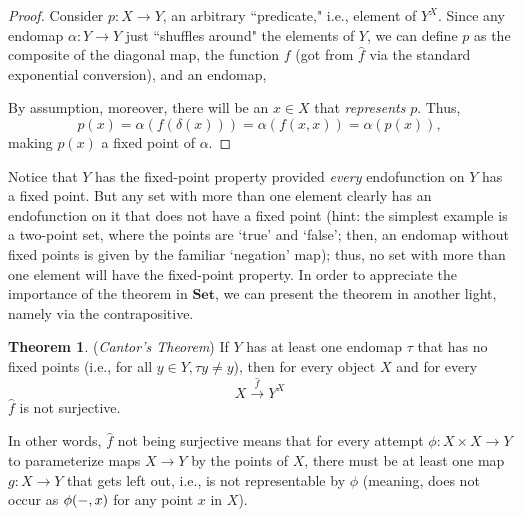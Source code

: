 \documentclass[a4paper]{book}
\theoremstyle{definition}
\theoremstyle{definition}
\theoremstyle{definition}
\newtheorem{theorem}{Theorem}[section]
\theoremstyle{theorem}
\theoremstyle{definition}
\begin{document}
\begin{proof}
	Consider $p: X \rightarrow Y$, an arbitrary ``predicate," i.e., element of $Y^X$. Since any endomap $\alpha: Y \rightarrow Y$ just ``shuffles around" the elements of $Y$, we can define $p$ as the composite of the diagonal map, the function $f$ (got from $\hat{f}$ via the standard exponential conversion), and an endomap, 
	\begin{center}
	\end{center}  
	By assumption, moreover, there will be an $x \in X$ that \textit{represents} $p$. Thus, 
	\begin{equation*}
	p(x) = \alpha(f(\delta(x))) = \alpha(f(x,x)) = \alpha(p(x)),
	\end{equation*}
	making $p(x)$ a fixed point of $\alpha$. 
\end{proof} \noindent 
Notice that $Y$ has the fixed-point property provided \textit{every} endofunction on $Y$ has a fixed point. But any set with more than one element clearly has an endofunction on it that does not have a fixed point (hint: the simplest example is a two-point set, where the points are `true' and `false'; then, an endomap without fixed points is given by the familiar `negation' map); thus, no set with more than one element will have the fixed-point property. In order to appreciate the importance of the theorem in $\textbf{Set}$, we can present the theorem in another light, namely via the contrapositive. 
\begin{theorem}
	(\textit{Cantor's Theorem}) If $Y$ has at least one endomap $\tau$ that has no fixed points (i.e., for all $y \in Y, \tau y \neq y$), then for every object $X$ and for every 
	\begin{equation*}
	X \xrightarrow{\hat{f}} Y^X 
	\end{equation*} 
	$\hat{f}$ is not surjective. \par 
	In other words, $\hat{f}$ not being surjective means that for every attempt $\phi: X \times X \rightarrow Y$ to parameterize maps $X \rightarrow Y$ by the points of $X$, there must be at least one map $g: X \rightarrow Y$ that gets left out, i.e., is not representable by $\phi$ (meaning, does not occur as $\phi(\--, x)$ for any point $x$ in $X$). 
\end{theorem}  
\end{document}
